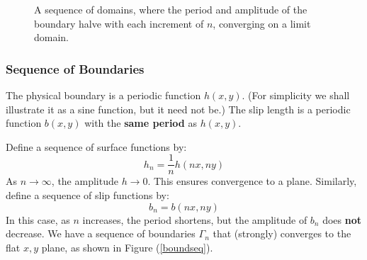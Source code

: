 \documentclass[12pt, a4paper, twoside, openright]{book}
\newcommand{\beff}{\ensuremath{b_{\mathrm{eff}}}}
\begin{document}
\clearpage
\begin{figure}[ht]
\centering
{}
\caption{A sequence of domains, where the period and amplitude of the boundary halve with each increment of $n$, converging on a limit domain.}\label{domainseq}
\end{figure}



\subsubsection{Sequence of Boundaries}

The physical boundary is a periodic function $h(x,y)$.  (For simplicity we shall illustrate it as a sine function, but it need not be.)  
The slip length is a periodic function $b(x,y)$ with the \textbf{same period} as $h(x,y)$.

\vspace{1em}
Define a sequence of surface functions by:
\begin{equation}
h_n = \frac{1}{n} h(nx, ny)
\end{equation}
As $n\to \infty$, the amplitude $h \to 0$.  This ensures convergence to a plane.
Similarly, define a sequence of slip functions by:
\begin{equation}
b_n = b(nx,ny)
\end{equation}
In this case, as $n$ increases, the period shortens, but the amplitude of $b_n$ does \textbf{not} decrease.
We have a sequence of boundaries $\Gamma_n$ that (strongly) converges to the flat $x,y$ plane, as shown in Figure (\ref{boundseq}).
\end{document}
